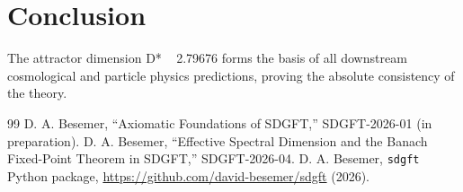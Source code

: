 \documentclass[amsmath,amssymb,aps,prd,twocolumn,superscriptaddress,nofootinbib]{revtex4-2}
\begin{document}
\section{Conclusion}
The attractor dimension D* ~ 2.79676 forms the basis of all downstream cosmological and particle physics predictions, proving the absolute consistency of the theory.



\begin{thebibliography}{99}
 D. A. Besemer, ``Axiomatic Foundations of SDGFT,'' SDGFT-2026-01 (in preparation).
 D. A. Besemer, ``Effective Spectral Dimension and the Banach Fixed-Point Theorem in SDGFT,'' SDGFT-2026-04.
 D. A. Besemer, \texttt{sdgft} Python package, \url{https://github.com/david-besemer/sdgft} (2026).
\end{thebibliography}
\end{document}
